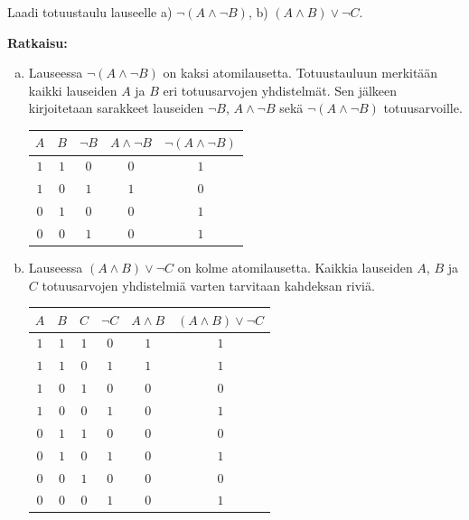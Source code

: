 \begin{esimerkki}
Laadi totuustaulu lauseelle a) $\lnot(A\land \lnot B)$, b) $(A\land B)\lor \lnot C$.

{\bf Ratkaisu:}
\begin{enumerate}[a)]
\item Lauseessa $\lnot(A\land \lnot B)$ on kaksi atomilausetta. Totuustauluun merkitään kaikki lauseiden $A$ ja $B$ eri totuusarvojen yhdistelmät. Sen jälkeen kirjoitetaan sarakkeet lauseiden $\lnot B$, $A\land \lnot B$ sekä $\lnot(A\land \lnot B)$  totuusarvoille.
\bigskip

\begin{center}
\begin{tabular}{|c|c|c|c|c|}\hline
$A$ & $B$ & $\lnot B$ & $A\land \lnot B$ & $\lnot(A\land \lnot B)$ \\ \hline
$1$ & $1$ & $0$       & $0$ & $1$ \\ 
$1$ & $0$ & $1$       & $1$ & $0$ \\
$0$ & $1$ & $0$       & $0$ & $1$ \\
$0$ & $0$ & $1$       & $0$ & $1$ \\ \hline
\end{tabular}
\end{center}

\bigskip

\item Lauseessa $(A\land B)\lor \lnot C$ on kolme atomilausetta. Kaikkia lauseiden $A$, $B$ ja $C$ totuusarvojen yhdistelmiä varten tarvitaan kahdeksan riviä.

\bigskip

\begin{center}
\begin{tabular}{|c|c|c|c|c|c|}\hline
$A$ & $B$ & $C$ & $\lnot C$ & $A\land B$ & $(A\land B)\lor \lnot C$\\ \hline
$1$ & $1$ & $1$ & $0$ & $1$ & $1$ \\ %
$1$ & $1$ & $0$ & $1$ & $1$ & $1$ \\
$1$ & $0$ & $1$ & $0$ & $0$ & $0$ \\
$1$ & $0$ & $0$ & $1$ & $0$ & $1$ \\
$0$ & $1$ & $1$ & $0$ & $0$ & $0$ \\
$0$ & $1$ & $0$ & $1$ & $0$ & $1$ \\
$0$ & $0$ & $1$ & $0$ & $0$ & $0$ \\
$0$ & $0$ & $0$ & $1$ & $0$ & $1$ \\ \hline
\end{tabular}
\end{center}

\end{enumerate}
\end{esimerkki}


